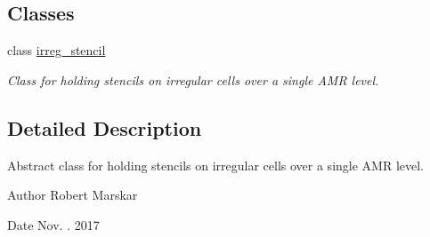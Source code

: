 \subsection*{Classes}
\begin{DoxyCompactItemize}
\item 
class \hyperlink{classirreg__stencil}{irreg\+\_\+stencil}
\begin{DoxyCompactList}\small\item\em Class for holding stencils on irregular cells over a single A\+MR level. \end{DoxyCompactList}\end{DoxyCompactItemize}


\subsection{Detailed Description}
Abstract class for holding stencils on irregular cells over a single A\+MR level. 

\begin{DoxyAuthor}{Author}
Robert Marskar 
\end{DoxyAuthor}
\begin{DoxyDate}{Date}
Nov. . 2017 
\end{DoxyDate}
